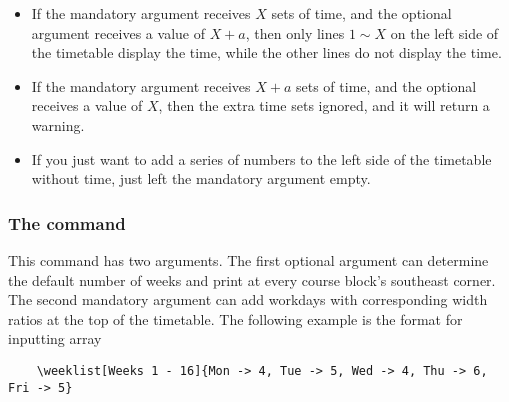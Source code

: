 \documentclass[letterpaper]{l3doc}
\newenvironment{example}{\begin{list}{}{\leftmargin=3em}\item }{\end{list}}
\begin{document}
\begin{itemize}
    \item If the mandatory argument receives $X$ sets of time, and the optional argument receives a value of $X+a$, then only lines $1\sim X$ on the left side of the timetable display the time, while the other lines do not display the time.
    \item If the mandatory argument receives $X+a$ sets of time, and the optional receives a value of $X$, then the extra time sets ignored, and it will return a warning.
    \item If you just want to add a series of numbers to the left side of the timetable without time, just left the mandatory argument empty.
\end{itemize}

\subsubsection{The  command}

\begin{example}
    \qquad
\end{example}

This command has two arguments. The first optional argument can determine the default number of weeks and print at every course block's southeast corner. The second mandatory argument can add workdays with corresponding width ratios at the top of the timetable. The following example is the format for inputting array

\begin{Verbatim}
    \weeklist[Weeks 1 - 16]{Mon -> 4, Tue -> 5, Wed -> 4, Thu -> 6, Fri -> 5}
\end{Verbatim}

\begin{figure}[!ht]
    \centering
\end{figure}
\end{document}
